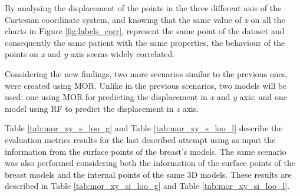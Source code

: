 By analysing the displacement of the points in the three different axis of the Cartesian coordinate system, and knowing that the same value of \textit{x} on all the charts in Figure \ref{fig:labels_corr}, represent the same point of the dataset and consequently the same patient with the same properties, the behaviour of the points on \textit{x} and \textit{y} axis seems widely correlated.

Considering the new findings, two more scenarios similar to the previous ones, were created using MOR. Unlike in the previous scenarios, two models will be used: one using MOR for predicting the displacement in \textit{x} and \textit{y} axis; and one model using RF to predict the displacement in \textit{z} axis.

Table \ref{tab:mor_xy_s_loo_g} and Table \ref{tab:mor_xy_s_loo_l} describe the evaluation metrics results for the last described attempt using as input the information from the surface points of the breast's models. The same scenario was also performed considering both the information of the surface points of the breast models and the internal points of the same 3D models. These results are described in Table \ref{tab:mor_xy_si_loo_g} and Table \ref{tab:mor_xy_si_loo_l}.

